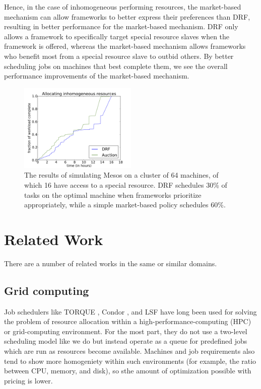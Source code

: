 \documentclass{acm_proc_article-sp}
\begin{document}
Hence, in the case of inhomogeneous performing resources, the market-based mechanism can allow frameworks to better express their preferences than DRF, resulting in better performance for the market-based mechanism. DRF only allows a framework to specifically target special resource slaves when the framework is offered, whereas the market-based mechanism allows frameworks who benefit most from a special resource slave to outbid others. By better scheduling jobs on machines that best complete them, we see the overall performance improvements of the market-based mechanism.


\begin{figure}
\includegraphics[width=0.5\textwidth]{images/inhomo_times.png}
\caption{The results of simulating Mesos on a cluster of 64 machines, of which 16 have access to a special resource. DRF schedules 30\% of tasks on the optimal machine when frameworks prioritize appropriately, while a simple market-based policy schedules 60\%.}
\label{img:inhomo}
\end{figure}


\section{Related Work}
\label{sec:related}

There are a number of related works in the same or similar domains.

\subsection{Grid computing}
Job schedulers like TORQUE \cite{torque}, Condor \cite{condor}, and LSF
\cite{lsf} have long been used for solving the problem of resource allocation
within a high-performance-computing (HPC) or grid-computing environment.
For the most part, they do not use a two-level scheduling model like we do but
instead operate as a queue for predefined jobs which are run as resources become
available. Machines and job requirements also tend to show more homogeniety
within such environments (for example, the ratio between CPU, memory, and disk),
so sthe amount of optimization possible with pricing is lower.
\end{document}
